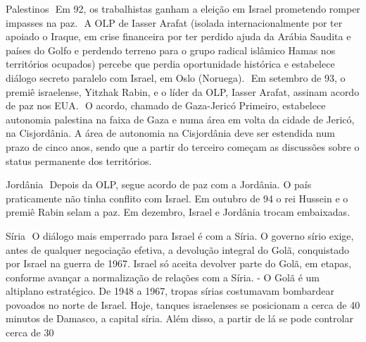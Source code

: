 Palestinos
 Em 92, os trabalhistas ganham a eleição em Israel prometendo romper impasses na paz.
 A OLP de Iasser Arafat (isolada internacionalmente por ter apoiado o Iraque, em crise financeira por ter perdido ajuda da Arábia Saudita e países do Golfo e perdendo terreno para o grupo radical islâmico Hamas nos territórios ocupados) percebe que perdia oportunidade histórica e estabelece diálogo secreto paralelo com Israel, em Oslo (Noruega).
 Em setembro de 93, o premiê israelense, Yitzhak Rabin, e o líder da OLP, Iasser Arafat, assinam acordo de paz nos EUA.
 O acordo, chamado de Gaza-Jericó Primeiro, estabelece autonomia palestina na faixa de Gaza e numa área em volta da cidade de Jericó, na Cisjordânia. A área de autonomia na Cisjordânia deve ser estendida num prazo de cinco anos, sendo que a partir do terceiro começam as discussões sobre o status permanente dos territórios.

Jordânia  Depois da OLP, segue acordo de paz com a Jordânia. O país praticamente não tinha conflito com Israel. Em outubro de 94 o rei Hussein e o premiê Rabin selam a paz. Em dezembro, Israel e Jordânia trocam embaixadas.

Síria  O diálogo mais emperrado para Israel é com a Síria. O governo sírio exige, antes de qualquer negociação efetiva, a devolução integral do Golã, conquistado por Israel na guerra de 1967. Israel só aceita devolver parte do Golã, em etapas, conforme avançar a normalização de relações com a Síria.
- O Golã é um altiplano estratégico. De 1948 a 1967, tropas sírias costumavam bombardear povoados no norte de Israel. Hoje, tanques israelenses se posicionam a cerca de 40 minutos de Damasco, a capital síria. Além disso, a partir de lá se pode controlar cerca de 30%

